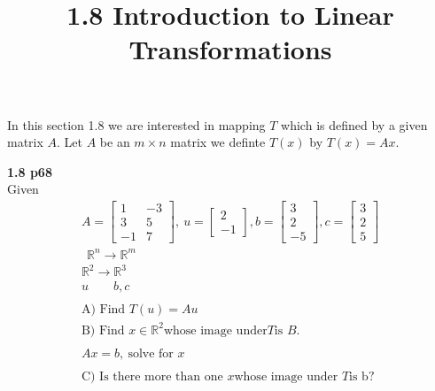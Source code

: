 \documentclass{article}
\title{1.8 Introduction to Linear Transformations}
\begin{document}
  \maketitle
  In this section 1.8 we are interested in mapping $ T $ which is defined by a given matrix $ A $. Let $ A $ be an $ m\times n $ matrix we definte $ T(x) $ by $ T(x) = Ax $.

  \textbf{1.8 p68}\\
  Given 
  \[
    \begin{gathered}
    A=\begin{bmatrix}
      1 &-3\\
      3 &5\\
      -1 &7
    \end{bmatrix},~u=
    \begin{bmatrix}
      2\\
      -1
    \end{bmatrix}, b =
    \begin{bmatrix}
      3\\
      2\\
      -5
    \end{bmatrix}, c=
    \begin{bmatrix}
      3\\
      2\\
      5
    \end{bmatrix}\\
    ~\
    \mathbb{R}^{n} \to \mathbb{R}^{m}\\
  \mathbb{R}^{2}\to \mathbb{R}^{3}\\
  u \qquad b,c\\
  ~\\
  \text{A) Find } T(u) = Au\\
  \text{B) Find } x \in \mathbb{R}^{2} \text{whose image under} T \text{is }B.\\
  ~\\
  Ax=b, ~ \text{solve for }x\\
  ~\\
  \text{C) Is there more than one } x \text{whose image under }T \text{is b?}
    \end{gathered}
  \]
\end{document}
